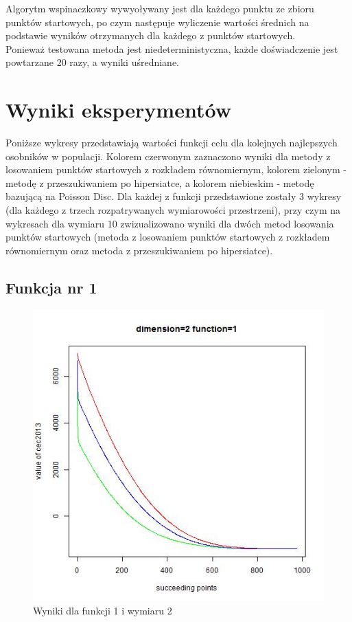 \documentclass{article}
\begin{document}
Algorytm wspinaczkowy wywyoływany jest dla każdego punktu ze zbioru punktów startowych, po czym następuje wyliczenie wartości średnich na podstawie wyników otrzymanych dla każdego z punktów startowych.\\
Ponieważ testowana metoda jest niedeterministyczna, każde doświadczenie jest powtarzane 20 razy, a wyniki uśredniane.\\


\section{Wyniki eksperymentów}
Poniższe wykresy przedstawiają wartości funkcji celu dla kolejnych najlepszych osobników w populacji. Kolorem czerwonym zaznaczono wyniki dla metody z losowaniem punktów startowych z rozkładem równomiernym, kolorem zielonym - metodę z przeszukiwaniem po hipersiatce, a kolorem niebieskim - metodę bazującą na Poisson Disc. Dla każdej z funkcji przedstawione zostały 3 wykresy (dla każdego z trzech rozpatrywanych wymiarowości przestrzeni), przy czym na wykresach dla wymiaru 10 zwizualizowano wyniki dla dwóch metod losowania punktów startowych (metoda z losowaniem punktów startowych z rozkładem równomiernym oraz metoda z przeszukiwaniem po hipersiatce).

\subsection{Funkcja nr 1}


\begin{figure}[H]
\centering
\includegraphics[scale=0.6]{dim_2__func_1}
\caption{Wyniki dla funkcji 1 i wymiaru 2}
\end{figure}
\end{document}
